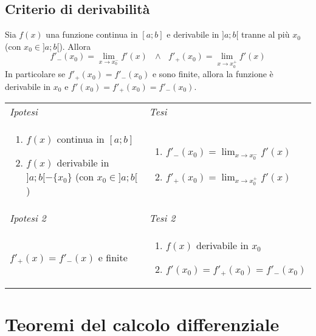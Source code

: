 \documentclass{article}     %
\begin{document}
    \subsection{Criterio di derivabilità}
        \begin{shadedTheorem}
            Sia $f(x)$ una funzione continua in $[a;b]$ e derivabile in $]a;b[$ tranne al più $x_0$ (con $x_0\in ]a;b[$). Allora 
            \[f'_-(x_0)=\lim_{x\to x_0^-}f'(x) ~~~\land~~~ f'_+(x_0)=\lim_{x\to x_0^+}f'(x)\]
            In particolare se $f'_+(x_0) = f'_-(x_0)$ e sono finite, allora la funzione è derivabile in $x_0$ e $f'(x_0)=f'_+(x_0) = f'_-(x_0)$.
        \end{shadedTheorem}
        \begin{tabular}{m{}m{}}
            \textit{Ipotesi} & \textit{Tesi}  \\
            \begin{enumerate}
                \item $f(x)$ continua in $[a;b]$
                \item $f(x)$ derivabile in $]a;b[-\{x_0\}$ (con $x_0\in]a;b[$)
            \end{enumerate} & \begin{enumerate}
                \item $f'_-(x_0)=\lim_{x\to x_0^-}f'(x)$
                \item $f'_+(x_0)=\lim_{x\to x_0^+}f'(x)$
            \end{enumerate}\\
            \textit{Ipotesi 2} & \textit{Tesi 2}  \\
            $f'_+(x) = f'_-(x)$ e finite & \begin{enumerate}
                \item $f(x)$ derivabile in $x_0$
                \item $f'(x_0)=f'_+(x_0) = f'_-(x_0)$
            \end{enumerate}
        \end{tabular}

\section{Teoremi del calcolo differenziale}
\end{document}
